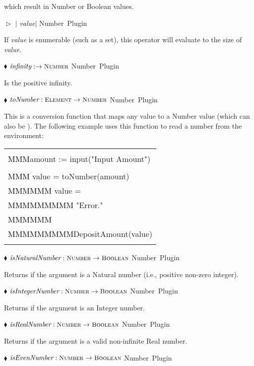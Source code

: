 \documentclass{article}
\newcommand{\codebf}[1]{\xspace{\bf \code{#1}}\xspace}
\newcommand{\keyword}[1]{\codebf{#1}}
\newcommand{\funcform}[2]{\pform{$\blacklozenge$}{#1}{#2}}
\newcommand{\opform}[2]{\pform{$\vartriangleright$}{#1}{#2}}
\newcommand{\pform}[3]{\vspace*{4mm} \noindent #1 #2 \vspace{1mm}\textcolor[gray]{0.7}{\dotfill}\mbox{{\sffamily \footnotesize #3}}}
\newcommand{\bExample}{\begin{small} \vspace{0.3cm} \begin{tabular}{|l} \begin{minipage}{0.85\textwidth} \vspace{0.2cm} \ttfamily}
\newcommand{\eExample}{\vspace{0.2cm} \end{minipage} \end{tabular} \vspace{0.3cm} \end{small}}
\newcommand{\val}{{\em value}\xspace}
\newcommand{\tab}{\textcolor[gray]{1}{MMM}}
\begin{document}
which result in Number or Boolean values.

\opform{$|$ \val $|$ }{Number Plugin}

If \val is enumerable (such as a set), this operator will evaluate to the size of \val.

\funcform{$\mbox{\it infinity} : \rightarrow \mbox{\scshape\small Number}$}{Number Plugin}

Is the positive infinity.

\funcform{$\mbox{\it toNumber} : \mbox{\scshape\small Element} \rightarrow \mbox{\scshape\small Number}$}{Number Plugin}

This is a conversion function that maps any value to a Number value (which can also be \keyword{undef}).
The following example uses this function to read a number from the environment:

\bExample
	\codebf{seq} \\
	\tab amount := input("Input Amount")\\
	\codebf{next} \\
	\tab \codebf{let} value = toNumber(amount) \codebf{in} \\
	\tab \tab \codebf{if} value = \codebf{undef} \codebf{then} \\
	\tab \tab \tab \codebf{print} "Error."\\
	\tab \tab \codebf{else} \\
	\tab \tab \tab DepositAmount(value)\\
\eExample

\funcform{$\mbox{\it isNaturalNumber} : \mbox{\scshape\small Number} \rightarrow \mbox{\scshape\small Boolean}$}{Number Plugin}

Returns  if the argument is a Natural number (i.e., positive non-zero integer).

\funcform{$\mbox{\it isIntegerNumber} : \mbox{\scshape\small Number} \rightarrow \mbox{\scshape\small Boolean}$}{Number Plugin}

Returns  if the argument is an Integer number.

\funcform{$\mbox{\it isRealNumber} : \mbox{\scshape\small Number} \rightarrow \mbox{\scshape\small Boolean}$}{Number Plugin}

Returns  if the argument is a valid non-infinite Real number.

\funcform{$\mbox{\it isEvenNumber} : \mbox{\scshape\small Number} \rightarrow \mbox{\scshape\small Boolean}$}{Number Plugin}
\end{document}
